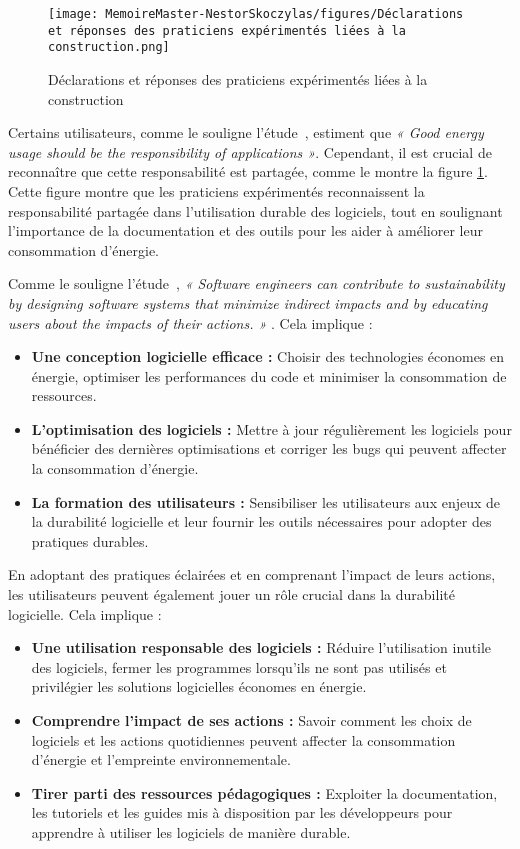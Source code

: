 \begin{figure}[H]
    \centering
    \texttt{[image: MemoireMaster-NestorSkoczylas/figures/Déclarations et réponses des praticiens expérimentés liées à la construction.png]}
    \caption{Déclarations et réponses des praticiens expérimentés liées à la construction}
    \label{fig:declaration-reponses-praticien}
\end{figure}

Certains utilisateurs, comme le souligne l'étude~\cite{EmpiricalStudy}, estiment que \emph{« Good energy usage should be the responsibility of applications »}. Cependant, il est crucial de reconnaître que cette responsabilité est partagée, comme le montre la figure \ref{fig:declaration-reponses-praticien}. Cette figure montre que les praticiens expérimentés reconnaissent la responsabilité partagée dans l'utilisation durable des logiciels, tout en soulignant l'importance de la documentation et des outils pour les aider à améliorer leur consommation d'énergie.


Comme le souligne l'étude~\cite{SafetySecuritySustainability}, \emph{« Software engineers can contribute to sustainability by designing software systems that minimize indirect impacts and by educating users about the impacts of their actions. »} . Cela implique :

\begin{itemize}
    \item \textbf{Une conception logicielle efficace :} Choisir des technologies économes en énergie, optimiser les performances du code et minimiser la consommation de ressources.
    \item \textbf{L'optimisation des logiciels :} Mettre à jour régulièrement les logiciels pour bénéficier des dernières optimisations et corriger les bugs qui peuvent affecter la consommation d'énergie.
    \item \textbf{La formation des utilisateurs :} Sensibiliser les utilisateurs aux enjeux de la durabilité logicielle et leur fournir les outils nécessaires pour adopter des pratiques durables.
\end{itemize}


En adoptant des pratiques éclairées et en comprenant l'impact de leurs actions, les utilisateurs peuvent également jouer un rôle crucial dans la durabilité logicielle. Cela implique :

\begin{itemize}
    \item \textbf{Une utilisation responsable des logiciels :} Réduire l'utilisation inutile des logiciels, fermer les programmes lorsqu'ils ne sont pas utilisés et privilégier les solutions logicielles économes en énergie.
    \item \textbf{Comprendre l'impact de ses actions :} Savoir comment les choix de logiciels et les actions quotidiennes peuvent affecter la consommation d'énergie et l'empreinte environnementale.
    \item \textbf{Tirer parti des ressources pédagogiques :} Exploiter la documentation, les tutoriels et les guides mis à disposition par les développeurs pour apprendre à utiliser les logiciels de manière durable.
\end{itemize}


